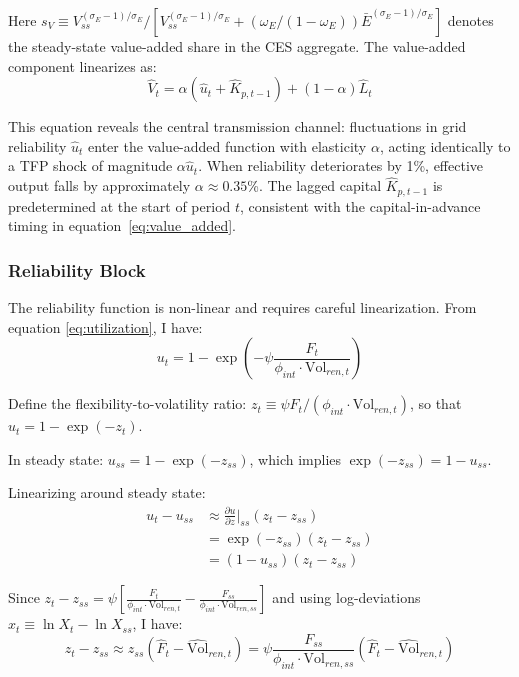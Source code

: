 \documentclass[12pt, a4paper]{article}
\begin{document}
Here $s_V \equiv V_{ss}^{(\sigma_E-1)/\sigma_E} / [V_{ss}^{(\sigma_E-1)/\sigma_E} + (\omega_E/(1-\omega_E)) \bar{E}^{(\sigma_E-1)/\sigma_E}]$ denotes the steady-state value-added share in the CES aggregate. The value-added component linearizes as:
\begin{equation}
\hat{V}_t = \alpha(\hat{u}_t + \hat{K}_{p,t-1}) + (1-\alpha)\hat{L}_t
\label{eq:va_lin}
\end{equation}

This equation reveals the central transmission channel: fluctuations in grid reliability $\hat{u}_t$ enter the value-added function with elasticity $\alpha$, acting identically to a TFP shock of magnitude $\alpha \hat{u}_t$. When reliability deteriorates by 1\%, effective output falls by approximately $\alpha \approx 0.35$\%. The lagged capital $\hat{K}_{p,t-1}$ is predetermined at the start of period $t$, consistent with the capital-in-advance timing in equation~\eqref{eq:value_added}.

\subsubsection{Reliability Block}

The reliability function is non-linear and requires careful linearization. From equation \eqref{eq:utilization}, I have:
\begin{equation}
u_t = 1 - \exp\left(-\psi \frac{F_t}{\phi_{int} \cdot \text{Vol}_{ren,t}}\right)
\end{equation}

Define the flexibility-to-volatility ratio: $z_t \equiv \psi F_t / (\phi_{int} \cdot \text{Vol}_{ren,t})$, so that $u_t = 1 - \exp(-z_t)$.

In steady state: $u_{ss} = 1 - \exp(-z_{ss})$, which implies $\exp(-z_{ss}) = 1 - u_{ss}$.

Linearizing around steady state:
\begin{align}
u_t - u_{ss} &\approx \frac{\partial u}{\partial z}\bigg|_{ss} (z_t - z_{ss}) \\
&= \exp(-z_{ss}) (z_t - z_{ss}) \\
&= (1 - u_{ss})(z_t - z_{ss})
\end{align}

Since $z_t - z_{ss} = \psi \left[\frac{F_t}{\phi_{int} \cdot \text{Vol}_{ren,t}} - \frac{F_{ss}}{\phi_{int} \cdot \text{Vol}_{ren,ss}}\right]$ and using log-deviations $\hat{x}_t \equiv \ln X_t - \ln X_{ss}$, I have:
\begin{equation}
z_t - z_{ss} \approx z_{ss}(\hat{F}_t - \hat{\text{Vol}}_{ren,t}) = \psi \frac{F_{ss}}{\phi_{int} \cdot \text{Vol}_{ren,ss}}(\hat{F}_t - \hat{\text{Vol}}_{ren,t})
\end{equation}
\end{document}

